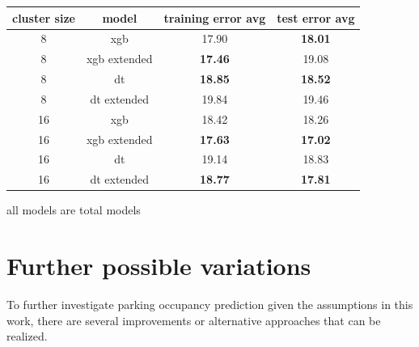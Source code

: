 \begin{table}[!ht]
	{\begin{tabular}{ | c | c | c | c | }
		\hline		
		\textbf{cluster size}  & \textbf{model} & \textbf{training error avg} & \textbf{test error avg} \\ \hline
		8 & {xgb} & 17.90 & \textbf{18.01} \\ \hline
		8 & {xgb extended} & \textbf{17.46} & 19.08 \\ \hline \hline
		8 & {dt} & \textbf{18.85} & \textbf{18.52} \\ \hline
		8 & {dt extended} & 19.84 & 19.46 \\ \hline \hline
		16 & {xgb} & 18.42 & 18.26 \\ \hline
		16 & {xgb extended} & \textbf{17.63} & \textbf{17.02} \\ \hline \hline
		16 & {dt} & 19.14 & 18.83 \\ \hline
		16 & {dt extended} & \textbf{18.77} & \textbf{17.81} \\ \hline
	\end{tabular}}
	\label{extensions:extended_models_comparison}
	\begin{tabnote}
		all models are total models
	\end{tabnote}
\end{table}
	
	
\section{Further possible variations}
\label{conclusion:future_work}
To further investigate parking occupancy prediction given the assumptions in this work, there are several improvements or alternative approaches that can be realized.

